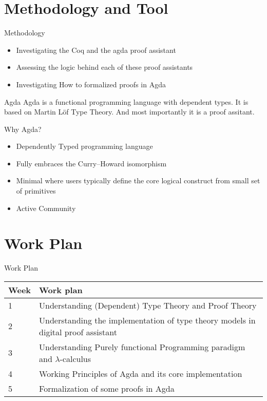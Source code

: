 \documentclass{beamer}
\begin{document}
\section{Methodology and Tool}
\begin{frame}{Methodology}
    \begin{itemize}
      \item Investigating the Coq and the agda proof assistant
      \item Assessing the logic behind each of these proof assistants
      \item Investigating How to formalized proofs in Agda
    \end{itemize}
\end{frame}
\begin{frame}{Agda}
Agda is a functional programming language with dependent types. It is based on Martin Löf Type Theory. And most importantly it is a proof assitant.
\cite{inproceedings}
\end{frame}
\begin{frame}{Why Agda?}
  \begin{itemize}
    \item Dependently Typed programming language
    \item Fully embraces the Curry–Howard isomorphism
    \item Minimal where users typically define the core logical construct from small set of primitives
    \item Active Community
  \end{itemize}
\end{frame}

\section{Work Plan}
\begin{frame}{Work Plan}
      \begin{tabular}{p{1cm} p{8cm} }
        \toprule
        Week & Work plan \\
        \toprule
         1 & Understanding (Dependent) Type Theory and Proof Theory\\
        \midrule
         2 & Understanding the implementation of type theory models in digital proof assistant \\
        \midrule
         3 & Understanding Purely functional Programming paradigm and $ \lambda $-calculus\\
        \midrule
         4 & Working Principles of Agda and its core implementation \\
        \midrule 
         5 & Formalization of some proofs in Agda \\
        \bottomrule


    \end{tabular}
\end{frame}
\end{document}
